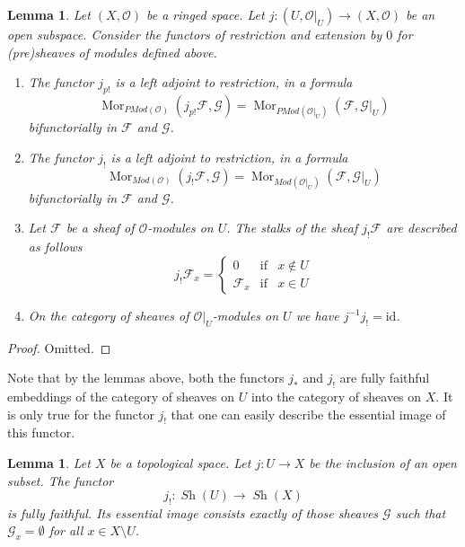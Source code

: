 \documentclass{stacks-project}
\theoremstyle{plain}
\newtheorem{lemma}[subsection]{Lemma}
\theoremstyle{definition}
\theoremstyle{remark}
\numberwithin{equation}{subsection}
\def\Mor{\mathop{\mathrm{Mor}}\nolimits}
\def\Sh{\mathop{\mathit{Sh}}\nolimits}
\begin{document}
\begin{lemma}
\label{lemma-j-shriek-modules}
Let $(X, \mathcal{O})$ be a ringed space.
Let $j : (U, \mathcal{O}|_U) \to (X, \mathcal{O})$
be an open subspace.
Consider the functors of restriction and extension
by $0$ for (pre)sheaves of modules defined above.
\begin{enumerate}
\item The functor $j_{p!}$ is a left adjoint to restriction,
in a formula
$$
\Mor_{\textit{PMod}(\mathcal{O})}(j_{p!}\mathcal{F}, \mathcal{G})
=
\Mor_{\textit{PMod}(\mathcal{O}|_U)}(\mathcal{F}, \mathcal{G}|_U)
$$
bifunctorially in $\mathcal{F}$ and $\mathcal{G}$.
\item The functor $j_!$ is a left adjoint to restriction,
in a formula
$$
\Mor_{\textit{Mod}(\mathcal{O})}(j_!\mathcal{F}, \mathcal{G})
=
\Mor_{\textit{Mod}(\mathcal{O}|_U)}(\mathcal{F}, \mathcal{G}|_U)
$$
bifunctorially in $\mathcal{F}$ and $\mathcal{G}$.
\item Let $\mathcal{F}$ be a sheaf of $\mathcal{O}$-modules on $U$.
The stalks of the sheaf $j_!\mathcal{F}$ are described
as follows
$$
j_{!}\mathcal{F}_x =
\left\{
\begin{matrix}
0 & \text{if} & x \not \in U \\
\mathcal{F}_x & \text{if} & x \in U
\end{matrix}
\right.
$$
\item On the category of sheaves of $\mathcal{O}|_U$-modules on $U$
we have $j^{-1}j_! = \text{id}$.
\end{enumerate}
\end{lemma}

\begin{proof}
Omitted.
\end{proof}

\noindent
Note that by the lemmas above, both the functors
$j_*$ and $j_!$ are fully faithful embeddings of
the category of sheaves on $U$ into the category
of sheaves on $X$. It is only true for the functor
$j_!$ that one can easily describe the essential
image of this functor.

\begin{lemma}
\label{lemma-equivalence-categories-open}
Let $X$ be a topological space.
Let $j : U \to X$ be the inclusion of an open subset.
The functor
$$
j_! : \Sh(U) \longrightarrow \Sh(X)
$$
is fully faithful. Its essential image consists exactly
of those sheaves $\mathcal{G}$ such that
$\mathcal{G}_x = \emptyset$ for all $x \in X \setminus U$.
\end{lemma}
\end{document}
